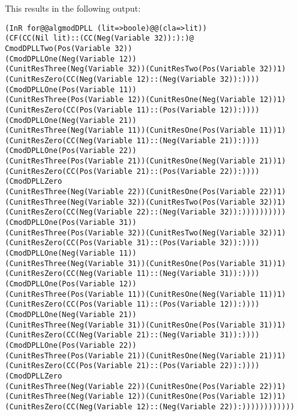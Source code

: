 This results in the following output:
\begin{lstlisting}
(InR for@@algmodDPLL (lit=>boole)@@(cla=>lit))
(CF(CC(Nil lit)::(CC(Neg(Variable 32)):):)@
CmodDPLLTwo(Pos(Variable 32))
(CmodDPLLOne(Neg(Variable 12))
(CunitResThree(Neg(Variable 32))(CunitResTwo(Pos(Variable 32))1)
(CunitResZero(CC(Neg(Variable 12)::(Neg(Variable 32)):))))
(CmodDPLLOne(Pos(Variable 11))
(CunitResThree(Pos(Variable 12))(CunitResOne(Neg(Variable 12))1)
(CunitResZero(CC(Pos(Variable 11)::(Pos(Variable 12)):))))
(CmodDPLLOne(Neg(Variable 21))
(CunitResThree(Neg(Variable 11))(CunitResOne(Pos(Variable 11))1)
(CunitResZero(CC(Neg(Variable 11)::(Neg(Variable 21)):))))
(CmodDPLLOne(Pos(Variable 22))
(CunitResThree(Pos(Variable 21))(CunitResOne(Neg(Variable 21))1)
(CunitResZero(CC(Pos(Variable 21)::(Pos(Variable 22)):))))
(CmodDPLLZero
(CunitResThree(Neg(Variable 22))(CunitResOne(Pos(Variable 22))1)
(CunitResThree(Neg(Variable 32))(CunitResTwo(Pos(Variable 32))1)
(CunitResZero(CC(Neg(Variable 22)::(Neg(Variable 32)):))))))))))
(CmodDPLLOne(Pos(Variable 31))
(CunitResThree(Pos(Variable 32))(CunitResTwo(Neg(Variable 32))1)
(CunitResZero(CC(Pos(Variable 31)::(Pos(Variable 32)):))))
(CmodDPLLOne(Neg(Variable 11))
(CunitResThree(Neg(Variable 31))(CunitResOne(Pos(Variable 31))1)
(CunitResZero(CC(Neg(Variable 11)::(Neg(Variable 31)):))))
(CmodDPLLOne(Pos(Variable 12))
(CunitResThree(Pos(Variable 11))(CunitResOne(Neg(Variable 11))1)
(CunitResZero(CC(Pos(Variable 11)::(Pos(Variable 12)):))))
(CmodDPLLOne(Neg(Variable 21))
(CunitResThree(Neg(Variable 31))(CunitResOne(Pos(Variable 31))1)
(CunitResZero(CC(Neg(Variable 21)::(Neg(Variable 31)):))))
(CmodDPLLOne(Pos(Variable 22))
(CunitResThree(Pos(Variable 21))(CunitResOne(Neg(Variable 21))1)
(CunitResZero(CC(Pos(Variable 21)::(Pos(Variable 22)):))))
(CmodDPLLZero
(CunitResThree(Neg(Variable 22))(CunitResOne(Pos(Variable 22))1)
(CunitResThree(Neg(Variable 12))(CunitResOne(Pos(Variable 12))1)
(CunitResZero(CC(Neg(Variable 12)::(Neg(Variable 22)):))))))))))))
\end{lstlisting}


\FloatBarrier
